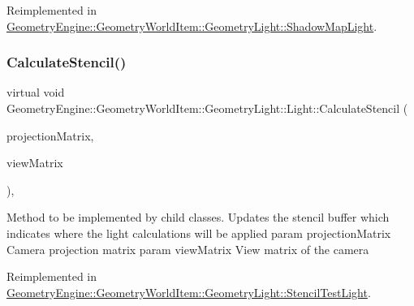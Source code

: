 Reimplemented in \mbox{\hyperlink{class_geometry_engine_1_1_geometry_world_item_1_1_geometry_light_1_1_shadow_map_light_a518efafd59e2dcd446140ae82140e172}{Geometry\+Engine\+::\+Geometry\+World\+Item\+::\+Geometry\+Light\+::\+Shadow\+Map\+Light}}.

\mbox{\label{class_geometry_engine_1_1_geometry_world_item_1_1_geometry_light_1_1_light_ae50fab4782158671041ac986dfead7fc}} 
\subsubsection{\texorpdfstring{CalculateStencil()}{CalculateStencil()}}
{\footnotesize\ttfamily virtual void Geometry\+Engine\+::\+Geometry\+World\+Item\+::\+Geometry\+Light\+::\+Light\+::\+Calculate\+Stencil (\begin{DoxyParamCaption}\item[{const Q\+Matrix4x4 \&}]{projection\+Matrix,  }\item[{const Q\+Matrix4x4 \&}]{view\+Matrix }\end{DoxyParamCaption})\hspace{0.3cm}{\ttfamily [inline]}, {\ttfamily [virtual]}}

Method to be implemented by child classes. Updates the stencil buffer which indicates where the light calculations will be applied param projection\+Matrix Camera projection matrix param view\+Matrix View matrix of the camera 

Reimplemented in \mbox{\hyperlink{class_geometry_engine_1_1_geometry_world_item_1_1_geometry_light_1_1_stencil_test_light_aa1d9d4bf4f47e6e55dbb1706a7e28697}{Geometry\+Engine\+::\+Geometry\+World\+Item\+::\+Geometry\+Light\+::\+Stencil\+Test\+Light}}.

\mbox{\label{class_geometry_engine_1_1_geometry_world_item_1_1_geometry_light_1_1_light_af367fa7201ad377a45fdc13e2002c518}} 
